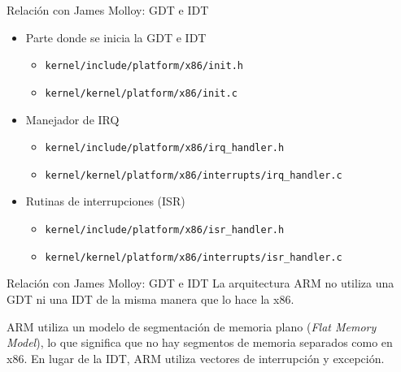 \begin{frame}{Relación con James Molloy: GDT e IDT}
	\begin{itemize} \setlength\itemsep{0pt} \footnotesize
			\item Parte donde se inicia la GDT e IDT
		\begin{itemize} \setlength\itemsep{0pt}
			\item \texttt{kernel/include/platform/x86/init.h}
			\item \texttt{kernel/kernel/platform/x86/init.c}
		\end{itemize}	
		
		\item Manejador de IRQ
		\begin{itemize} \setlength\itemsep{0pt}
			\item \texttt{kernel/include/platform/x86/irq\_handler.h}
			\item \texttt{kernel/kernel/platform/x86/interrupts/irq\_handler.c}
		\end{itemize}	
		
		\item Rutinas de interrupciones (ISR)
		\begin{itemize} \setlength\itemsep{0pt}
			\item \texttt{kernel/include/platform/x86/isr\_handler.h}
			\item \texttt{kernel/kernel/platform/x86/interrupts/isr\_handler.c}
		\end{itemize}	
	\end{itemize}
\end{frame}


\begin{frame}{Relación con James Molloy: GDT e IDT}
	La arquitectura ARM no utiliza una GDT ni una IDT de la misma manera que lo hace la x86.
	
	ARM utiliza un modelo de segmentación de memoria plano (\textit{Flat Memory Model}), lo que significa que no hay segmentos de memoria separados como en x86. En lugar de la IDT, ARM utiliza vectores de interrupción y excepción.
	
\end{frame}



